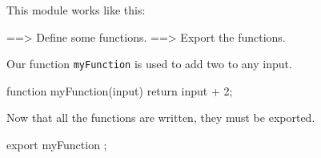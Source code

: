 \documentclass[11pt,a4paper]{article}
\begin{document}
This module works like this:

\begin{code}
==> Define some functions.
==> Export the functions.
\end{code}

Our function \texttt{myFunction} is used to add two to any input.

\begin{code}[name=Define some functions]
function myFunction(input) {
  return input + 2;
}
\end{code}

Now that all the functions are written, they must be exported.

\begin{code}[name=Export the functions]
export { myFunction };
\end{code}
\end{document}
